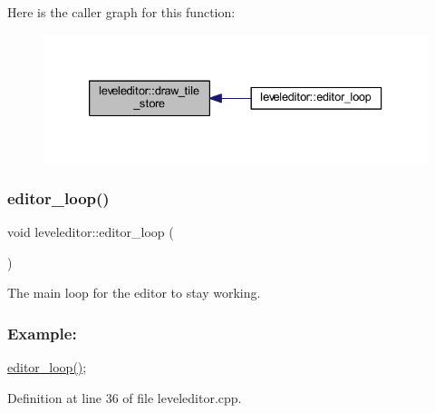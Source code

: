 Here is the caller graph for this function\+:
\nopagebreak
\begin{figure}[H]
\begin{center}
\leavevmode
\includegraphics[width=333pt]{classleveleditor_ac87f89b0889c243ab43cfbbc7fd70836_icgraph}
\end{center}
\end{figure}
\mbox{\label{classleveleditor_a2ee968e4a8d305cdb1465397388b63f2}} 
\subsubsection{\texorpdfstring{editor\+\_\+loop()}{editor\_loop()}}
{\footnotesize\ttfamily void leveleditor\+::editor\+\_\+loop (\begin{DoxyParamCaption}{ }\end{DoxyParamCaption})}



The main loop for the editor to stay working. 

\subsubsection*{Example\+: }

\hyperlink{classleveleditor_a2ee968e4a8d305cdb1465397388b63f2}{editor\+\_\+loop()}; ~\newline


Definition at line 36 of file leveleditor.\+cpp.

